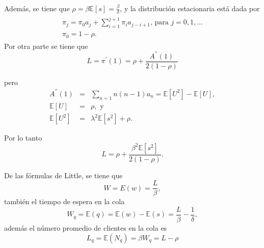 \documentclass{article}
\newcommand{\esp}{\mathbb{E}}
\numberwithin{equation}{section}
\begin{document}
Adem\'as, se tiene que $\rho=\beta\esp\left[s\right]=\frac{\beta}{\delta}$, y la distribuci\'on estacionaria est\'a dada por
\begin{eqnarray}
\begin{array}{l}
\pi_{j}=\pi_{0}a_{j}+\sum_{i=1}^{j+1}\pi_{i}a_{j-i+1}\textrm{, para }j=0,1,\ldots\\
\pi_{0}=1-\rho.
\end{array}
\end{eqnarray}
Por otra parte se tiene que\begin{equation}
L=\pi^{'}\left(1\right)=\rho+\frac{A^{''}\left(1\right)}{2\left(1-\rho\right)}
\end{equation}

pero 
\begin{eqnarray*}
A^{''}\left(1\right)&=&\sum_{n=1}n\left(n-1\right)a_{n}= \esp\left[U^{2}\right]-\esp\left[U\right],\\
\esp\left[U\right]&=&\rho,\textrm{ y }\\
\esp\left[U^{2}\right]&=&\lambda^{2}\esp\left[s^{2}\right]+\rho.
\end{eqnarray*}

Por lo tanto 
\begin{equation}
L=\rho+\frac{\beta^{2}\esp\left[s^{2}\right]}{2\left(1-\rho\right)}.
\end{equation}

De las f\'ormulas de Little, se tiene que 
\begin{equation}
W=E\left(w\right)=\frac{L}{\beta},
\end{equation}
tambi\'en el tiempo de espera en la cola
\begin{equation}
W_{q}=\esp\left(q\right)=\esp\left(w\right)-\esp\left(s\right)=\frac{L}{\beta}-\frac{1}{\delta},
\end{equation}
adem\'as el n\'umero promedio de clientes en la cola es
\begin{equation}
L_{q}=\esp\left(N_{q}\right)=\beta W_{q}=L-\rho
\end{equation}


\end{document}
